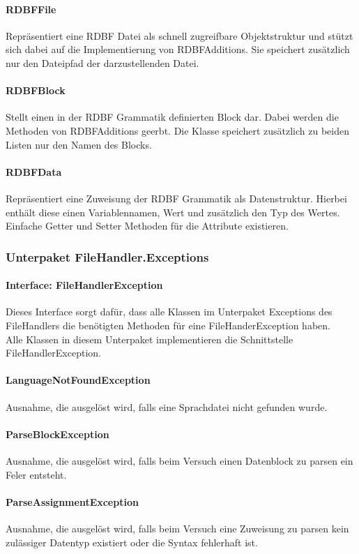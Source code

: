 \documentclass[parskip=full]{scrartcl}
\begin{document}
\paragraph{RDBFFile}
Repräsentiert eine RDBF Datei als schnell zugreifbare Objektstruktur und stützt sich dabei auf die Implementierung von RDBFAdditions.
Sie speichert zusätzlich nur den Dateipfad der darzustellenden Datei.
\paragraph{RDBFBlock}
Stellt einen in der RDBF Grammatik definierten Block dar. Dabei werden die Methoden von RDBFAdditions geerbt.
Die Klasse speichert zusätzlich zu beiden Listen nur den Namen des Blocks.
\paragraph{RDBFData}
Repräsentiert eine Zuweisung der RDBF Grammatik als Datenstruktur. Hierbei enthält diese einen Variablennamen, Wert und zusätzlich den Typ des Wertes.
Einfache Getter und Setter Methoden für die Attribute existieren.
\subsubsection{Unterpaket FileHandler.Exceptions}
\paragraph{Interface: FileHandlerException}
Dieses Interface sorgt dafür, dass alle Klassen im Unterpaket Exceptions des FileHandlers die benötigten Methoden für eine FileHanderException haben.
\\
Alle Klassen in diesem Unterpaket implementieren die Schnittstelle FileHandlerException.
\paragraph{LanguageNotFoundException}
Ausnahme, die ausgelöst wird, falls eine Sprachdatei nicht gefunden wurde.
\paragraph{ParseBlockException}
Ausnahme, die ausgelöst wird, falls beim Versuch einen Datenblock zu parsen ein Feler entsteht.
\paragraph{ParseAssignmentException}
Ausnahme, die ausgelöst wird, falls beim Versuch eine Zuweisung zu parsen kein zulässiger Datentyp existiert oder die Syntax fehlerhaft ist.
\end{document}
